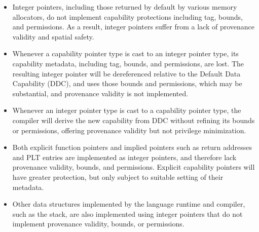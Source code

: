 \documentclass[12pt,twoside,openright,a4paper]{article}
\newcommand{\note}[2]{{\color{blue}[ Note: #1 - #2]}}
\renewcommand{\note}[2]{\relax\ifhmode\unskip\fi}
\newcommand{\bdnote}[1]{\note{#1}{Brooks D.}}
\newcommand{\nwfnote}[1]{\note{#1}{nwf}}
\newcommand{\dcnote}[1]{\note{#1}{David}}
\begin{document}
\begin{itemize}
\item Integer pointers, including those returned by default by various memory allocators, do
  not implement capability protections including tag, bounds, and permissions.
  As a result, integer pointers suffer from a lack of provenance validity and
  spatial safety.
  \bdnote{Furthermore, an unmodified allocator may produce allocations lacking
  sufficient alignment support precise bounds.}

\item Whenever a capability pointer type is cast to an integer pointer type,
  its capability metadata, including tag, bounds, and permissions, are lost.
  The resulting integer pointer will be dereferenced relative to the Default
  Data Capability (DDC), and uses those bounds and permissions, which may be
  substantial, and provenance validity is not implemented.

  \dcnote{And, more importantly, casts are not symmetric.  Int to cap pointer
    casts always allow you to access everything with the result that you could
    access with the source.  Caps to int casts may give null.  In to cap to int
    casts are always safe round trips, cap to int to cap may give either a
    capability with more rights or the null capability.}

  \nwfnote{Casts to integers of tag-clear capabilities trap or succeed?}

\item Whenever an integer pointer type is cast to a capability pointer type,
  the compiler will derive the new capability from DDC without refining its
  bounds or permissions, offering provenance validity but not privilege
  minimization.

\item Both explicit function pointers and implied pointers such as return
  addresses and PLT entries are implemented as integer pointers, and therefore
  lack provenance validity, bounds, and permissions.
  Explicit capability pointers will have greater protection, but only subject
  to suitable setting of their metadata.

\item Other data structures implemented by the language runtime and compiler,
  such as the stack, are also implemented using integer pointers that do not
  implement provenance validity, bounds, or permissions.


\end{itemize}
\end{document}
